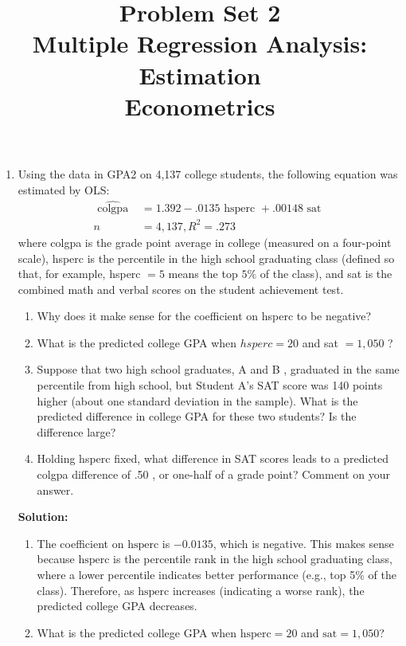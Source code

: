 \documentclass[12pt]{article}
\author{\empty}
\title{Problem Set 2\\Multiple Regression Analysis: Estimation\\Econometrics}
\date{\empty}
\begin{document}
	\maketitle
	
\begin{enumerate}
	
\item Using the data in GPA2 on 4,137 college students, the following equation was estimated by OLS:
$$
\begin{aligned}
\widehat{\text { colgpa }} & =1.392-.0135 \text { hsperc }+.00148 \text { sat } \\
n & =4,137, R^2=.273
\end{aligned}
$$
where colgpa is the grade point average in college (measured on a four-point scale), hsperc is the percentile in the high school graduating class (defined so that, for example, hsperc $=5$ means the top $5 \%$ of the class), and sat is the combined math and verbal scores on the student achievement test.
\begin{enumerate}
    \item Why does it make sense for the coefficient on hsperc to be negative?
\item What is the predicted college GPA when $h s p e r c=20$ and sat $=1,050$ ?
\item Suppose that two high school graduates, A and B , graduated in the same percentile from high school, but Student A's SAT score was 140 points higher (about one standard deviation in the sample). What is the predicted difference in college GPA for these two students? Is the difference large?
\item Holding hsperc fixed, what difference in SAT scores leads to a predicted colgpa difference of .50 , or one-half of a grade point? Comment on your answer.
\end{enumerate}

{\color{blue}
\noindent \textbf{Solution:}

\begin{enumerate}
    \item    The coefficient on \( \text{hsperc} \) is \( -0.0135 \), which is negative. This makes sense because \( \text{hsperc} \) is the percentile rank in the high school graduating class, where a lower percentile indicates better performance (e.g., top 5\% of the class). Therefore, as \( \text{hsperc} \) increases (indicating a worse rank), the predicted college GPA decreases.

    \item What is the predicted college GPA when \( \text{hsperc} = 20 \) and \( \text{sat} = 1,050 \)?


\end{enumerate}}
\end{enumerate}
\end{document}
